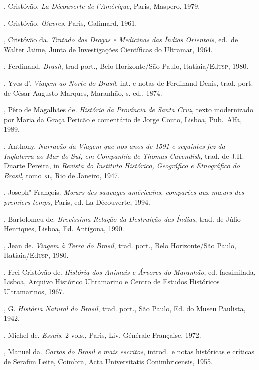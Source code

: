 \begin{bibliohedra}
, Cristóvão. \textit{La Découverte de l'Amérique}, Paris, Maspero, 1979.

, Cristóvão. \textit{\OE uvres}, Paris, Galimard, 1961.

, Cristóvão da. \textit{Tratado das Drogas e Medicinas das Índias
Orientais}, ed.~de Walter Jaime, Junta de Investigações Científicas do Ultramar, 1964.

, Ferdinand. \textit{Brasil}, trad port., Belo
Horizonte/São Paulo, Itatiaia/Ed\textsc{usp}, 1980.

, Yves d'. \textit{Viagem ao Norte do Brasil}, int. e notas de
Ferdinand Denis, trad. port. de César Augusto Marques, Maranhão, s. ed., 1874.

, Pêro de Magalhães de. \textit{História da Província de Santa
Cruz}, texto modernizado por Maria da Graça Pericão e comentário de
Jorge Couto, Lisboa, Pub.~Alfa, 1989.

, Anthony. \textit{Narração da Viagem que nos anos de 1591 e
seguintes fez da Inglaterra ao Mar do Sul, em Companhia de Thomas
Cavendish}, trad. de J.H. Duarte Pereira, in \textit{Revista do
Instituto Histórico, Geográfico e Etnográfico do Brasil}, tomo \textsc{xl}, Rio de Janeiro, 1947.

, Joseph"-François. \textit{M\oe urs des sauvages américains,
comparées aux m\oe urs des premiers temps}, Paris, ed. La Découverte, 1994.

, Bartolomeu de. \textit{Brevíssima Relação da Destruição das
Índias}, trad. de Júlio Henriques, Lisboa, Ed. Antígona, 1990.

, Jean de. \textit{Viagem à Terra do Brasil}, trad. port., Belo
Horizonte/São Paulo, Itatiaia/Ed\textsc{usp}, 1980.

, Frei Cristóvão de. \textit{História dos Animais e Árvores do
Maranhão}, ed. facsimilada, Lisboa, Arquivo Histórico Ultramarino e
Centro de Estudos Históricos Ultramarinos, 1967.

, G. \textit{História Natural do Brasil}, trad. port., São
Paulo, Ed. do Museu Paulista, 1942.

, Michel de. \textit{Essais}, 2 vols., Paris, Liv. Générale Française, 1972.

, Manuel da. \textit{Cartas do Brasil e mais escritos}, introd.~e 
notas históricas e críticas de Serafim Leite, Coimbra, Acta Universitatis Conimbricensis, 1955.


\end{bibliohedra}
